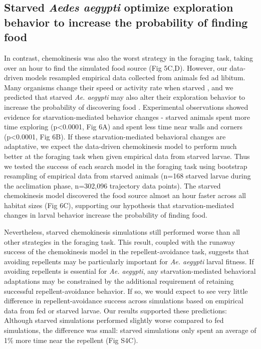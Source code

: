\subsection*{Starved \textit{Aedes aegypti} optimize exploration behavior to increase the probability of finding food}
\noindent In contrast, chemokinesis was also the worst strategy in the foraging task, taking over an hour to find the simulated food source (Fig 5C,D). However, our data-driven models resampled empirical data collected from animals fed ad libitum. Many organisms change their speed or activity rate when starved \cite{De_Jager2014-if}, and we predicted that starved \textit{Ae. aegypti} may also alter their exploration behavior to increase the probability of discovering food \cite{De_Jager2014-if}. Experimental observations showed evidence for starvation-mediated behavior changes - starved animals spent more time exploring (p<0.0001, Fig 6A) and spent less time near walls and corners (p<0.0001, Fig 6B). If these starvation-mediated behavioral changes are adaptative, we expect the data-driven chemokinesis model to perform much better at the foraging task when given empirical data from starved larvae. Thus we tested the success of each search model in the foraging task using bootstrap resampling of empirical data from starved animals (n=168 starved larvae during the acclimation phase, n=302,096 trajectory data points). The starved chemokinesis model discovered the food source almost an hour faster across all habitat sizes (Fig 6C), supporting our hypothesis that starvation-mediated changes in larval behavior increase the probability of finding food. 

Nevertheless, starved chemokinesis simulations still performed worse than all other strategies in the foraging task. This result, coupled with the runaway success of the chemokinesis model in the repellent-avoidance task, suggests that avoiding repellents may be particularly important for \textit{Ae. aegypti} larval fitness. If avoiding repellents is essential for \textit{Ae. aegypti}, any starvation-mediated behavioral adaptations may be constrained by the additional requirement of retaining successful repellent-avoidance behavior. If so, we would expect to see very little difference in repellent-avoidance success across simulations based on empirical data from fed or starved larvae. Our results supported these predictions: Although starved simulations performed slightly worse compared to fed simulations, the difference was small: starved simulations only spent an average of 1${\%}$ more time near the repellent (Fig S4C). 


